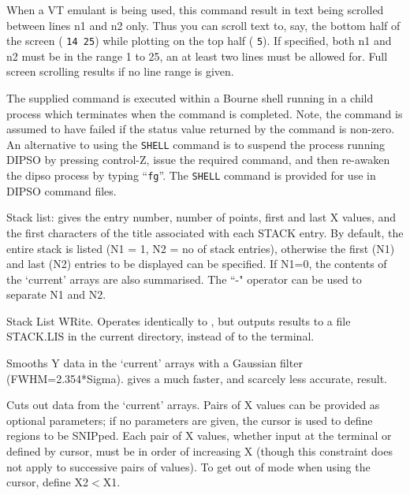 \begin {description}
When a VT emulant is being used, this command result in text being
scrolled between lines n1 and n2 only. Thus you can scroll text to,
say, the bottom half of the screen
( {\tt 14 25}) while plotting on
the top half ( {\tt 5}). If specified, both n1 and n2 must be in the
range 1 to 25, an at least two lines must be allowed for. Full screen
scrolling results if no line range is given.

The supplied command is executed within a Bourne shell running in a child
process which terminates when the command is completed. Note, the command
is assumed to have failed if the status value returned by the command is
non-zero. An alternative to using the {\tt SHELL} command is to suspend
the process running DIPSO by pressing control-Z, issue the required
command, and then re-awaken the dipso process by typing ``{\tt fg}''. The
{\tt SHELL} command is provided for use in DIPSO command files.

Stack list: gives the entry number, number of points, first and last X
values, and the first characters of the title associated with each
STACK entry. By default, the entire stack is listed (N1 = 1, N2 = no
of stack entries), otherwise the first (N1) and last (N2) entries to
be displayed can be specified. If N1=0, the contents of the `current'
arrays are also summarised. The ``-" operator can be used to separate
N1 and N2.

Stack List WRite. Operates identically to ,  but outputs results to a
file STACK.LIS in the current directory, instead of to the terminal.

Smooths Y data in the `current' arrays with a Gaussian filter
(FWHM=2.354*Sigma).   gives a much faster, and scarcely less
accurate, result.

Cuts out data from the `current' arrays. Pairs of X values can be
provided as optional parameters; if no parameters are given, the
cursor is used to define regions to be SNIPped. Each pair of X values,
whether input at the terminal or defined by cursor, must be in order
of increasing X (though this constraint does not apply to successive
pairs of values). To get out of   mode when using the cursor,
define X2$<$X1.


\end{description}
